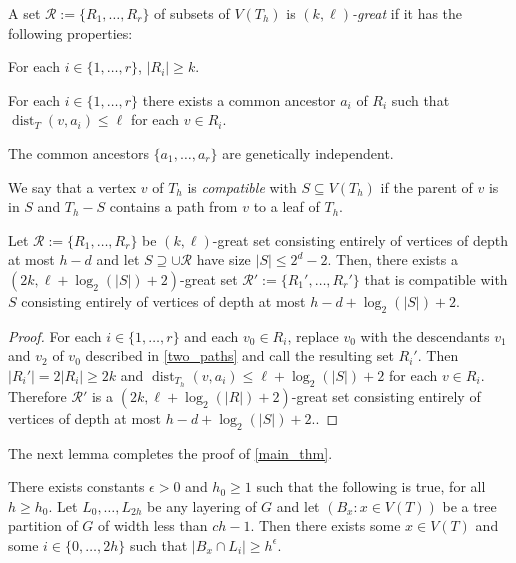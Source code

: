 \documentclass{patmorin}
\newcommand{\defin}[1]{\emph{\color{brightmaroon}#1}}
\DeclareMathOperator{\dist}{dist}
\begin{document}
A set $\mathcal{R}:=\{R_1,\ldots,R_r\}$ of subsets of $V(T_h)$ is \defin{$(k,\ell)$-great} if it has the following properties:

\begin{compactenum}
  \item For each $i\in\{1,\ldots,r\}$, $|R_i|\ge k$.
  \item For each $i\in\{1,\ldots,r\}$ there exists a common ancestor $a_i$ of $R_i$ such that $\dist_T(v,a_i)\le\ell$ for each $v\in R_i$.
  \item The common ancestors $\{a_1,\ldots,a_r\}$ are genetically independent.
\end{compactenum}

We say that a vertex $v$ of $T_h$ is \defin{compatible} with $S\subseteq V(T_h)$ if the parent of $v$ is in $S$ and $T_h-S$ contains a path from $v$ to a leaf of $T_h$.
  

\begin{lem}\label{compatible_set}
  Let $\mathcal{R}:=\{R_1,\ldots,R_r\}$ be $(k,\ell)$-great set consisting entirely of vertices of depth at most $h-d$ and let $S\supseteq \cup\mathcal{R}$ have size $|S|\le 2^d-2$.  Then, there exists a $(2k,\ell + \log_2(|S|)+2)$-great set $\mathcal{R}':=\{R_1',\ldots,R_r'\}$ that is compatible with $S$ consisting entirely of vertices of depth at most $h-d+\log_2(|S|)+2$.
\end{lem}

\begin{proof}
  For each $i\in\{1,\ldots,r\}$ and each $v_0\in R_i$, replace $v_0$ with the descendants $v_1$ and $v_2$ of $v_0$ described in \cref{two_paths} and call the resulting set $R_i'$.   Then $|R_i'|=2|R_i|\ge 2k$ and $\dist_{T_h}(v,a_i)\le \ell+\log_2(|S|)+2$ for each $v\in R_i$.  Therefore $\mathcal{R}'$ is a $(2k,\ell + \log_2(|R|)+2)$-great set consisting entirely of vertices of depth at most $h-d+\log_2(|S|)+2$..
\end{proof}

The next lemma completes the proof of \cref{main_thm}.
\begin{lem}
  There exists constants $\epsilon >0$ and $h_0\ge 1$ such that the following is true, for all $h \ge h_0$.  Let $L_0,\ldots,L_{2h}$ be any layering of $G$ and let $(B_x:x\in V(T))$ be a tree partition of $G$ of width less than $ch-1$.  Then there exists some $x\in V(T)$ and some $i\in\{0,\ldots,2h\}$ such that $|B_x\cap L_i| \ge h^{\epsilon}$.
\end{lem}
\end{document}
